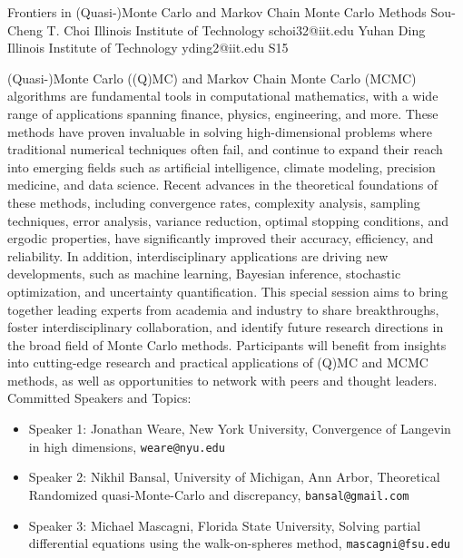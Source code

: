 \begin{session}
 {Frontiers in (Quasi-)Monte Carlo and Markov Chain Monte Carlo Methods}%
 {Sou-Cheng T.  Choi}%
 {Illinois Institute of Technology}%
 {schoi32@iit.edu}%
 {Yuhan Ding}%
 {Illinois Institute of Technology}%
 {yding2@iit.edu}%
 {S15}%
{}

 (Quasi-)Monte Carlo ((Q)MC) and Markov Chain Monte Carlo (MCMC) algorithms are fundamental tools in computational mathematics, with a wide range of applications spanning finance, physics, engineering, and more. These methods have proven invaluable in solving high-dimensional problems where traditional numerical techniques often fail, and continue to expand their reach into emerging fields such as artificial intelligence, climate modeling, precision medicine, and data science.
 Recent advances in the theoretical foundations of these methods, including convergence rates, complexity analysis, sampling techniques, error analysis, variance reduction, optimal stopping conditions, and ergodic properties, have significantly improved their accuracy, efficiency, and reliability. In addition, interdisciplinary applications are driving new developments, such as machine learning, Bayesian inference, stochastic optimization, and uncertainty quantification.
 This special session aims to bring together leading experts from academia and industry to share breakthroughs, foster interdisciplinary collaboration, and identify future research directions in the broad field of Monte Carlo methods. Participants will benefit from insights into cutting-edge research and practical applications of (Q)MC and MCMC methods, as well as opportunities to network with peers and thought leaders.
 Committed Speakers and Topics:
 \begin{itemize}
 \item Speaker 1: Jonathan Weare, New York University, Convergence of Langevin in high dimensions, \texttt{weare@nyu.edu}
 \item Speaker 2: Nikhil Bansal, University of Michigan, Ann Arbor, Theoretical Randomized quasi-Monte-Carlo and discrepancy, \texttt{bansal@gmail.com}
 \item Speaker 3: Michael Mascagni, Florida State University, Solving partial differential equations using the walk-on-spheres method, \texttt{mascagni@fsu.edu}

\end{itemize}
\end{session}
